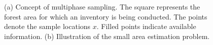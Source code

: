 \documentclass[article]{jss}
\begin{document}
\begin{figure}[htb]
	\begin{subfigure}[t]{0.5\textwidth}
		\centering
		\caption{} \label{fig:concmphase_and_sae_a}
		\end{subfigure}
	\begin{subfigure}[t]{0.5\textwidth}
		\centering
		\caption{} \label{fig:concmphase_and_sae_b}
	\end{subfigure}
\caption{(a) Concept of multiphase sampling. The square represents the forest area for which an inventory is being conducted. The points denote the sample locations $x$. Filled points indicate available information. (b) Illustration of the small area estimation problem.}
\label{fig:concmphase_and_sae}
\end{figure}
\end{document}

